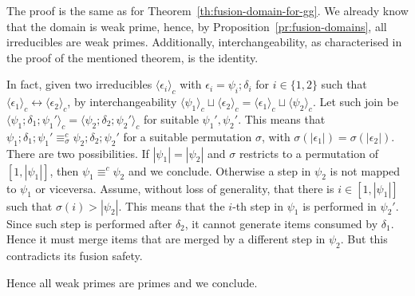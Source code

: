 \documentclass[conference]{IEEEtran}
\renewenvironment{proof}{\begin{IEEEproof}}{\end{IEEEproof}}
\newcommand{\Rrel}[1]   {\stackrel{{#1}}{\Longrightarrow}}
\newcommand{\interval}[2][1]{\ensuremath{[{#1},{#2}]}}
\newcommand{\ltrace}[1]{\ensuremath{\langle {#1}\rangle_c}}
\begin{document}
\begin{proof}
  The proof is the same as for
  Theorem~\ref{th:fusion-domain-for-gg}. We already know that the
  domain is weak prime, hence, by Proposition~\ref{pr:fusion-domains},
  all irreducibles are weak primes.  Additionally, interchangeability,
  as characterised in the proof of the mentioned theorem, is the
  identity.


  In fact, given two irreducibles $\ltrace{\epsilon_i}$ with
  $\epsilon_i = \psi_i; \delta_i$ for $i \in \{1,2\}$ such that
  $\ltrace{\epsilon_1} \leftrightarrow \ltrace{\epsilon_2}$, by
  interchangeability
  $\ltrace{\psi_1} \sqcup \ltrace{\epsilon_2} =
  \ltrace{\epsilon_1} \sqcup \ltrace{\psi_2}$. Let such join be
  $\ltrace{\psi_1; \delta_1; \psi_1'} = \ltrace{\psi_2; \delta_2;
    \psi_2'}$ for suitable $\psi_1', \psi_2'$. This means that
  $\psi_1; \delta_1; \psi_1' \equiv^c_\sigma \psi_2; \delta_2;
  \psi_2'$ for a suitable permutation $\sigma$, with
  $\sigma(|\epsilon_1|) = \sigma(|\epsilon_2|)$. There are two
  possibilities. If $|\psi_1| = |\psi_2|$ and $\sigma$ restricts to a
  permutation of $\interval{|\psi_1|}$, then $\psi_1 \equiv^c \psi_2$
  and we conclude. Otherwise a step in $\psi_2$ is not mapped
  to $\psi_1$ or viceversa. Assume, without loss of generality, that
  there is $i \in \interval{|\psi_1|}$ such that
  $\sigma(i) > |\psi_2|$. This means that the $i$-th step in $\psi_1$
  is performed in $\psi_2'$. Since such step is performed after
  $\delta_2$, it cannot generate items consumed by $\delta_1$. Hence
  it must merge items that are merged by a different step in
  $\psi_2$. But this contradicts its fusion safety.

  \smallskip
  
  Hence all weak primes are primes and we
  conclude.
\end{proof}




\end{document}
